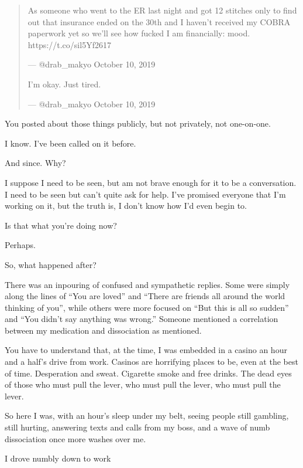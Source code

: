 \begin{paracol}{2}
\begin{leftcolumn}
\begin{quotation}
As someone who went to the ER last night and got 12 stitches only to find out that insurance ended on the 30th and I haven't received my COBRA paperwork yet so we'll see how fucked I am financially: mood. https://t.co/sil5Yf2617

--- @drab\_makyo October 10, 2019

I'm okay. Just tired.

--- @drab\_makyo October 10, 2019
\end{quotation}
\newpage

\begin{ally}
You posted about those things publicly, but not privately, not one-on-one.
\end{ally}
I know. I've been called on it before.

\begin{ally}
And since. Why?
\end{ally}
I suppose I need to be seen, but am not brave enough for it to be a conversation. I need to be seen but can't quite ask for help. I've promised everyone that I'm working on it, but the truth is, I don't know how I'd even begin to.

\begin{ally}
Is that what you're doing now?
\end{ally}
Perhaps.
\newpage

\begin{ally}
So, what happened after?
\end{ally}
There was an inpouring of confused and sympathetic replies. Some were simply along the lines of ``You are loved'' and ``There are friends all around the world thinking of you'', while others were more focused on ``But this is all so sudden'' and ``You didn't say anything was wrong.'' Someone mentioned a correlation between my medication and dissociation as mentioned.

You have to understand that, at the time, I was embedded in a casino an hour and a half's drive from work. Casinos are horrifying places to be, even at the best of time. Desperation and sweat. Cigarette smoke and free drinks. The dead eyes of those who must pull the lever, who must pull the lever, who must pull the lever.

So here I was, with an hour's sleep under my belt, seeing people still gambling, still hurting, answering texts and calls from my boss, and a wave of numb dissociation once more washes over me.

I drove numbly down to work


\end{leftcolumn}
\end{paracol}
